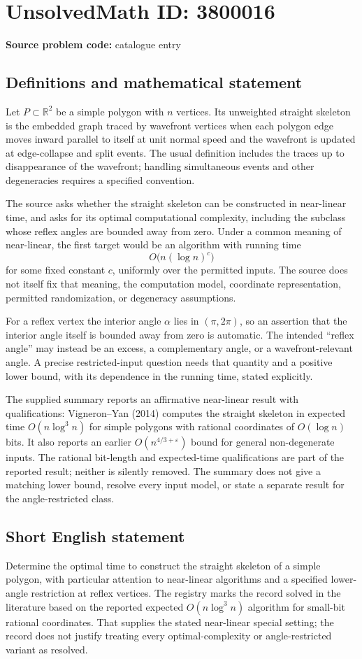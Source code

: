 \documentclass[11pt]{article}
\newcommand{\R}{\mathbb{R}}
\begin{document}
\section*{UnsolvedMath ID: 3800016}
\textbf{Source problem code:} catalogue entry
\subsection{Definitions and mathematical statement}
Let $P\subset\R^2$ be a simple polygon with $n$ vertices. Its unweighted straight skeleton is the embedded graph traced by wavefront vertices when each polygon edge moves inward parallel to itself at unit normal speed and the wavefront is updated at edge-collapse and split events. The usual definition includes the traces up to disappearance of the wavefront; handling simultaneous events and other degeneracies requires a specified convention.

The source asks whether the straight skeleton can be constructed in near-linear time, and asks for its optimal computational complexity, including the subclass whose reflex angles are bounded away from zero. Under a common meaning of near-linear, the first target would be an algorithm with running time
\[
 O\bigl(n(\log n)^c\bigr)
\]
for some fixed constant $c$, uniformly over the permitted inputs. The source does not itself fix that meaning, the computation model, coordinate representation, permitted randomization, or degeneracy assumptions.

For a reflex vertex the interior angle $\alpha$ lies in $(\pi,2\pi)$, so an assertion that the interior angle itself is bounded away from zero is automatic. The intended ``reflex angle'' may instead be an excess, a complementary angle, or a wavefront-relevant angle. A precise restricted-input question needs that quantity and a positive lower bound, with its dependence in the running time, stated explicitly.

The supplied summary reports an affirmative near-linear result with qualifications: Vigneron--Yan (2014) computes the straight skeleton in expected time $O(n\log^3 n)$ for simple polygons with rational coordinates of $O(\log n)$ bits. It also reports an earlier $O(n^{4/3+\varepsilon})$ bound for general non-degenerate inputs. The rational bit-length and expected-time qualifications are part of the reported result; neither is silently removed. The summary does not give a matching lower bound, resolve every input model, or state a separate result for the angle-restricted class.
\subsection{Short English statement}
Determine the optimal time to construct the straight skeleton of a simple polygon, with particular attention to near-linear algorithms and a specified lower-angle restriction at reflex vertices. The registry marks the record solved in the literature based on the reported expected $O(n\log^3n)$ algorithm for small-bit rational coordinates. That supplies the stated near-linear special setting; the record does not justify treating every optimal-complexity or angle-restricted variant as resolved.
\end{document}
